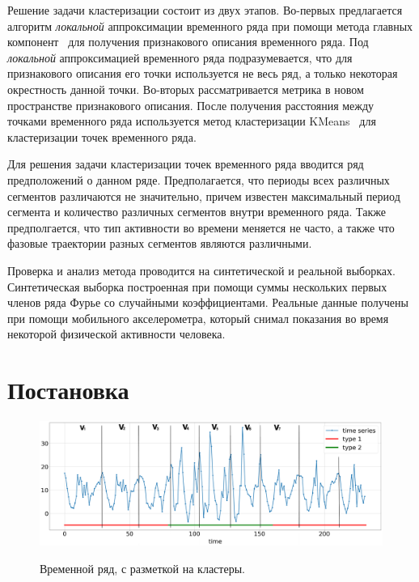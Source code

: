 \documentclass[12pt, twoside]{article}
\begin{document}
Решение задачи кластеризации состоит из двух этапов. Во-первых предлагается алгоритм \textit{локальной} аппроксимации временного ряда при помощи метода главных компонент~\cite{Shiglavsi1997} для получения признакового описания временного ряда. Под \textit{локальной} аппроксимацией временного ряда подразумевается, что для признакового описания его точки используется не весь ряд, а только некоторая окрестность данной точки. Во-вторых рассматривается метрика в новом пространстве признакового описания. После получения расстояния между точками временного ряда используется метод кластеризации KMeans~\cite{Kanungo2000} для кластеризации точек временного ряда.

Для решения задачи кластеризации точек временного ряда вводится ряд предположений о данном ряде. Предполагается, что периоды всех различных сегментов различаются не значительно, причем известен максимальный период сегмента и количество различных сегментов внутри временного ряда. Также предполгается, что тип активности во времени меняется не часто, а также что фазовые траектории разных сегментов являются различными. 

Проверка и анализ метода проводится на синтетической и реальной выборках. Синтетическая выборка построенная при помощи суммы нескольких первых членов ряда Фурье со случайными коэффициентами. Реальные данные получены при помощи мобильного акселерометра, который снимал показания во время некоторой физической активности человека.



\section{Постановка}\label{statment}

\begin{figure}[h!t]\center
\includegraphics[width=1\textwidth]{results/example}\\
\caption{Временной ряд, с разметкой на кластеры.}
\label{example_1}
\end{figure}
\end{document}
